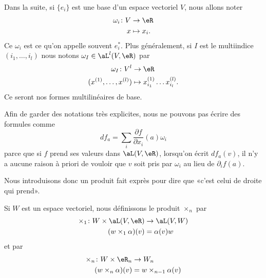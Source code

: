 \begin{normaltext}
    Dans la suite, si \( \{ e_i \}\) est une base d'un espace vectoriel \( V\), nous allons noter
    \begin{equation}
        \begin{aligned}
            \omega_i\colon V&\to \eR \\
            x&\mapsto x_i.
        \end{aligned}
    \end{equation}
    Ce \( \omega_i\) est ce qu'on appelle souvent \( e_i^*\). Plus généralement, si \( I\) est le multiindice \( (i_1,\ldots, i_l)\) nous notons \( \omega_I\in \aL^l(V,\eR)\) par
    \begin{equation}
        \begin{aligned}
            \omega_I\colon V^l&\to \eR \\
            (x^{(1)},\ldots, x^{(l)})&\mapsto  x^{(1)}_{i_1}\ldots x^{(l)}_{i_l}.
        \end{aligned}
    \end{equation}
    Ce seront nos formes multilinéaires de base.
\end{normaltext}

Afin de garder des notations très explicites, nous ne pouvons pas écrire des formules comme
\[
    df_a=\sum_i\frac{ \partial f }{ \partial x_i }(a)\omega_i
\]
parce que si \( f\) prend ses valeurs dans \( \aL(V,\eR)\), lorsqu'on écrit \( df_a(v)\), il n'y a aucune raison à priori de vouloir que \( v\) soit pris par \( \omega_i\) au lieu de \( \partial_if(a)\).

Nous introduisons donc un produit fait exprès pour dire que «c'est celui de droite qui prend».
\begin{definition}       \label{DEFooLULCooYjBEaZ}
    Si \( W\) est un espace vectoriel, nous définissons le produit \( \times_n\) par
    \begin{equation}
        \begin{aligned}
            \times_1\colon W\times \aL(V,\eR)&\to \aL(V,W) \\
            (w\times_1\alpha)(v)&=\alpha(v)w
        \end{aligned}
    \end{equation}
    et par
    \begin{equation}
        \begin{aligned}
            \times_n\colon W\times \eR_n&\to W_n \\
            (w\times_n\alpha)(v)&=w\times_{n-1} \alpha(v)
        \end{aligned}
    \end{equation}
\end{definition}

